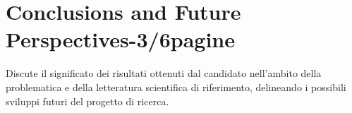 
\chapter{Conclusions and Future Perspectives-3/6pagine} %

\label{Chapter6} %


 Discute il significato dei risultati ottenuti dal candidato nell’ambito della problematica e della letteratura scientifica di riferimento, delineando i possibili sviluppi futuri del progetto di ricerca.

 
